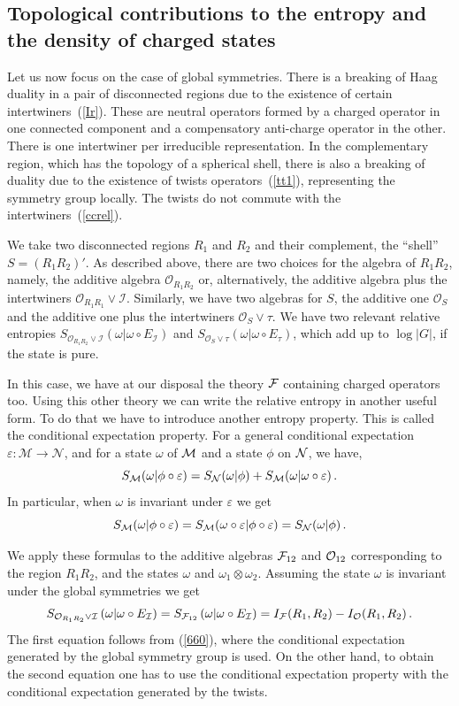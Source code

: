 \documentclass[12pt]{article}
\numberwithin{equation}{section}
\newcommand{\be}{\begin{equation}}
\newcommand{\ee}{\end{equation}}
\begin{document}
\subsection{Topological contributions to the entropy and the density of charged states}

Let us now focus on the case of global symmetries. There is a breaking of Haag duality in a pair of disconnected regions due to the existence of certain intertwiners~(\ref{Ir}). These are neutral operators formed by a charged operator in one connected component and a compensatory anti-charge operator in the other. There is one intertwiner per irreducible representation. In the complementary region, which has the topology of a spherical shell, there is also a breaking of duality due to the existence of twists operators~(\ref{tt1}), representing the symmetry group locally. The twists do not commute with the intertwiners~(\ref{ccrel}).  

We take two disconnected regions $R_1$ and $R_2$ and their complement, the ``shell''  $S=(R_1 R_2)'$. As described above, there are  two choices for the algebra of $R_1 R_2$, namely, the additive algebra $\mathcal{O}_{R_1R_2}$ or, alternatively, the additive algebra plus the intertwiners $\mathcal{O}_{R_1R_1}\vee \mathcal{I}$. Similarly, we have two algebras for $S$, the additive one $\mathcal{O}_{S}$ and the additive one plus the intertwiners $\mathcal{O}_{S}\vee \tau$. 
We have two relevant relative entropies 
$
S_{\mathcal{O}_{R_1R_2}\vee \mathcal{I}}\left(\omega|\omega\circ E_\mathcal{I}\right)$ and $S_{\mathcal{O}_{S}\vee \tau}\left(\omega|\omega\circ E_\tau\right)$, which add up to $\log|G|$, if the state is pure.  

In this case, we have at our disposal the theory ${\cal F}$ containing charged operators too. Using this other theory we can write the relative entropy in another useful form. To do that we have to introduce another entropy property. This is called 
 the conditional expectation property. For a general conditional expectation $\varepsilon : \mathcal{M}\rightarrow \mathcal{N}$, and for a state $\omega$ of ${\cal M}$ and a state $\phi$ on ${\cal N}$, we have,
\be
S_{\cal M}(\omega|\phi\circ \varepsilon)=S_{\cal N}(\omega|\phi)+S_{\cal M}(\omega|\omega\circ \varepsilon)\,.
\ee
In particular, when $\omega$ is invariant under $\varepsilon$ we get
\be
S_{\cal M}(\omega|\phi\circ \varepsilon)=S_{\cal M}(\omega\circ \varepsilon|\phi\circ \varepsilon)=S_{\cal N}(\omega|\phi)\,.\label{660}
\ee

We apply these formulas to the additive algebras ${\cal F}_{12}$ and ${\cal O}_{12}$ corresponding to the region $R_1R_2$, and the  states $\omega$ and $\omega_1\otimes \omega_2$. Assuming the state $\omega$ is invariant under the global symmetries we get 
\be
 S_{\mathcal{O}_{R_1R_2}\vee \mathcal{I}}\left(\omega|\omega\circ E_\mathcal{I}\right)= S_{{\cal F}_{12}}\left(\omega|\omega\circ E_\mathcal{I}\right)=I_{{\cal F}}(R_1,R_2)-I_{\cal O}(R_1,R_2)\,.
\label{mutualdif}\ee 
The first equation follows from (\ref{660}), where the conditional expectation generated by the global symmetry group is used.  On the other hand, to obtain the second equation one has to use the conditional expectation property with the conditional expectation generated by the twists.   
\end{document}
